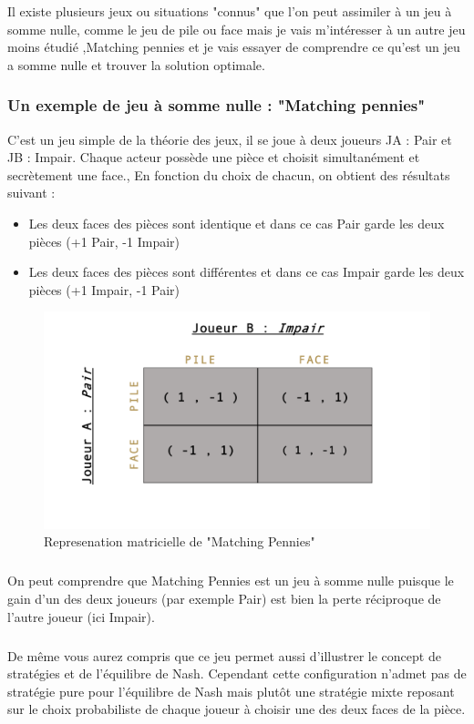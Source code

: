 \documentclass[a4paper, 12pt, twoside]{article}
\begin{document}
{{Il existe plusieurs jeux ou situations "connus" que l'on peut assimiler à un \textsf{jeu à somme nulle}, comme le jeu de \textsf{pile ou face} mais je vais m'intéresser  à un autre jeu  moins étudié ,\textsf{Matching pennies} et je vais essayer de comprendre ce qu'est un \textsf{jeu a somme nulle} et trouver la solution optimale.

\subsubsection{Un exemple de jeu à somme nulle  :  "Matching pennies"}
C'est un jeu simple de la théorie des jeux, il se joue à deux joueurs \textsf{JA} : \textsf{Pair}  et \textsf{JB} : \textsf{Impair}. Chaque acteur possède une pièce et choisit simultanément et secrètement une face., En fonction du choix de chacun, on obtient des résultats suivant :

\begin{itemize}
\item Les deux faces des pièces sont identique et dans ce cas Pair garde les deux pièces (+1 Pair, -1 Impair)
\item Les deux faces des pièces sont différentes et dans ce cas Impair garde les deux pièces (+1 Impair, -1 Pair)
\end{itemize}  \vspace{0.2 cm}

\begin{figure}[h!]
\centering
\includegraphics[scale=0.4]{Matching.pdf}
\caption{Represenation matricielle de "Matching Pennies"}
\end{figure} 

\subparagraph*{}{On peut comprendre que \textsf{Matching Pennies} est un jeu à somme nulle puisque le gain d'un des deux joueurs (par exemple Pair) est bien la perte réciproque de l'autre joueur (ici Impair).} 
\subparagraph*{}{De même vous aurez compris que ce jeu permet aussi d'illustrer le concept  de stratégies et de l'\textsf{équilibre de Nash}. Cependant cette configuration n'admet pas de stratégie pure pour l'\textsf{équilibre de Nash} mais plutôt une stratégie mixte reposant sur le choix probabiliste de chaque joueur à choisir une des deux faces de la pièce.}

}}
\end{document}
